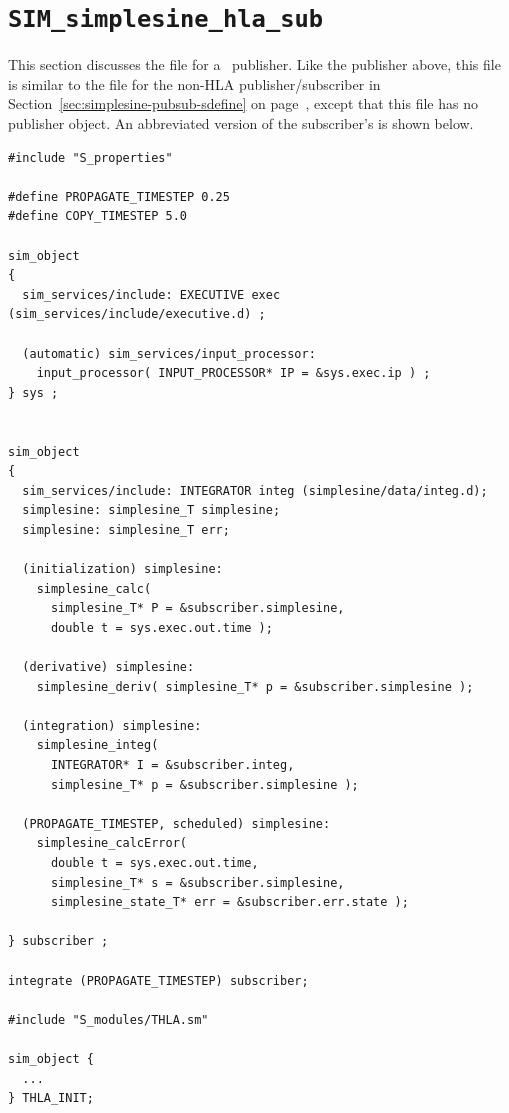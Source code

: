 \section{{\tt SIM\_simplesine\_hla\_sub}}
This section discusses the \sdefine file for a \TrickHLA\ publisher.
Like the publisher above, this file is similar to the \sdefine file for
the non-HLA publisher/subscriber
in Section~\ref{sec:simplesine-pubsub-sdefine} on page~\pageref{sec:simplesine-pubsub-sdefine},
except that this file has no publisher object.
An abbreviated version of the subscriber's \sdefine is shown below.

\begin{lstlisting}[caption={{\tt SIM\_simplesine\_hla\_sub} \sdefine},label={list:SIM-simplesine-hla-sub-sdefine}]
#include "S_properties"

#define PROPAGATE_TIMESTEP 0.25
#define COPY_TIMESTEP 5.0

sim_object
{
  sim_services/include: EXECUTIVE exec (sim_services/include/executive.d) ;

  (automatic) sim_services/input_processor:
    input_processor( INPUT_PROCESSOR* IP = &sys.exec.ip ) ;
} sys ;


sim_object
{
  sim_services/include: INTEGRATOR integ (simplesine/data/integ.d);
  simplesine: simplesine_T simplesine;
  simplesine: simplesine_T err;

  (initialization) simplesine:
    simplesine_calc(
      simplesine_T* P = &subscriber.simplesine,
      double t = sys.exec.out.time );

  (derivative) simplesine:
    simplesine_deriv( simplesine_T* p = &subscriber.simplesine );

  (integration) simplesine:
    simplesine_integ(
      INTEGRATOR* I = &subscriber.integ,
      simplesine_T* p = &subscriber.simplesine );

  (PROPAGATE_TIMESTEP, scheduled) simplesine:
    simplesine_calcError(
      double t = sys.exec.out.time,
      simplesine_T* s = &subscriber.simplesine,
      simplesine_state_T* err = &subscriber.err.state );

} subscriber ;

integrate (PROPAGATE_TIMESTEP) subscriber;

#include "S_modules/THLA.sm"

sim_object {
  ...
} THLA_INIT;
\end{lstlisting}

